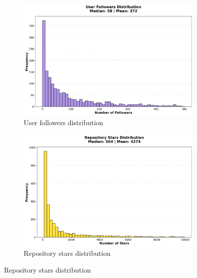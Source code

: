 \documentclass[11pt]{article}
\begin{document}
\begin{figure}[H]
\begin{subfigure}[b]{0.48\textwidth}
\centering
\includegraphics[width=\textwidth]{figures_individual/21_user_followers_histogram.png}
\caption{User followers distribution}
\label{fig:followers}
\end{subfigure}
\hfill
\begin{subfigure}[b]{0.48\textwidth}
\centering
\includegraphics[width=\textwidth]{figures_individual/22_repo_stars_histogram.png}
\caption{Repository stars distribution}
\label{fig:stars}
\end{subfigure}

\vspace{0.3cm}


\end{figure}
\end{document}
